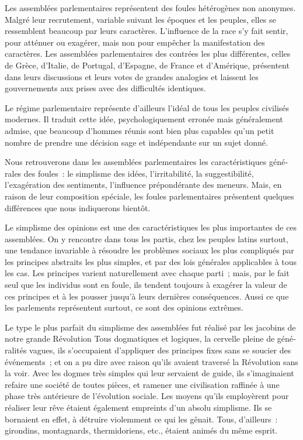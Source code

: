 \documentclass[french,twoside]{book} %
\begin{document}
\noindent Les assemblées parlementaires représentent des foules hétérogènes non anony­mes. Malgré leur recrutement, variable suivant les époques et les peuples, elles se ressemblent beaucoup par leurs caractères. L’influence de la race s’y fait sentir, pour atténuer ou exagérer, mais non pour empêcher la manifestation des caractères. Les assemblées parlementaires des contrées les plus différentes, celles de Grèce, d’Italie, de Portugal, d’Espagne, de France et d’Amérique, présentent dans leurs discussions et leurs votes de grandes analogies et laissent les gouvernements aux prises avec des difficultés identiques.\par
Le régime parlementaire représente d’ailleurs l’idéal de tous les peuples civilisés modernes. Il traduit cette idée, psychologiquement erronée mais généralement admi­se, que beaucoup d’hommes réunis sont bien plus capables qu’un petit nombre de prendre une décision sage et indépendante sur un sujet donné.\par
Nous retrouverons dans les assemblées parlementaires les caractéristiques géné­rales des foules : le simplisme des idées, l’irritabilité, la suggestibilité, l’exagération des sentiments, l’influence prépondérante des meneurs. Mais, en raison de leur com­position spéciale, les foules parlementaires présentent quelques différences que nous indiquerons bientôt.\par
Le simplisme des opinions est une des caractéristiques les plus importantes de ces assemblées. On y rencontre dans tous les partis, chez les peuples latins surtout, une tendance invariable à résoudre les problèmes sociaux les plus compliqués par les principes abstraits les plus simples, et par des lois générales applicables à tous les cas. Les principes varient naturellement avec chaque parti ; mais, par le fait seul que les individus sont en foule, ils tendent toujours à exagérer la valeur de ces principes et à les pousser jusqu’à leurs dernières conséquences. Aussi ce que les parlements représentent sur­tout, ce sont des opinions extrêmes.\par
Le type le plus parfait du simplisme des assemblées fut réalisé par les jacobins de notre grande Révolution Tous dogmatiques et logiques, la cervelle pleine de géné­ralités vagues, ils s’occupaient d’appliquer des principes fixes sans se soucier des événements ; et on a pu dire avec raison qu’ils avaient traversé la Révolution sans la voir. Avec les dogmes très simples qui leur servaient de guide, ils s’imaginaient refaire une société de toutes pièces, et ramener une civilisation raffinée à une phase très antérieure de l’évolution sociale. Les moyens qu’ils employèrent pour réaliser leur rêve étaient également empreints d’un absolu simplisme. Ils se bornaient en effet, à détruire violemment ce qui les gênait. Tous, d’ailleurs : girondins, montagnards, ther­midoriens, etc., étaient animés du même esprit.\par
\end{document}
